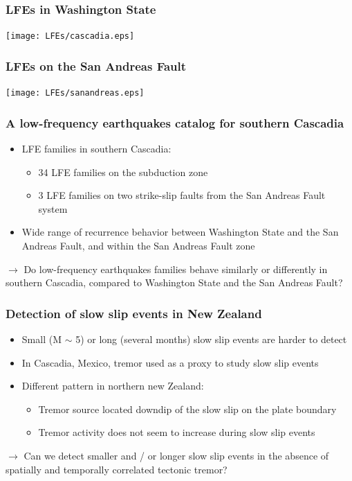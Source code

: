 \documentclass{beamer}
\begin{document}
	\begin{frame}
		\frametitle{LFEs in Washington State}
		\begin{center}
			\texttt{[image: LFEs/cascadia.eps]}
		\end{center}
	\end{frame}

	\begin{frame}
		\frametitle{LFEs on the San Andreas Fault}
		\begin{center}
			\texttt{[image: LFEs/sanandreas.eps]}
		\end{center}
	\end{frame}

	\begin{frame}
		\frametitle{A low-frequency earthquakes catalog for southern Cascadia}
		\begin{itemize}
			\item LFE families in southern Cascadia:
			\begin{itemize}
				\item 34 LFE families on the subduction zone
				\item 3 LFE families on two strike-slip faults from the San Andreas Fault system
			\end{itemize}
			\item Wide range of recurrence behavior between Washington State and the San Andreas Fault, and within the San Andreas Fault zone
		\end{itemize}
		
		\begin{block}{}
			$\rightarrow$ Do low-frequency earthquakes families behave similarly or differently in southern Cascadia, compared to Washington State and the San Andreas Fault?
		\end{block}
	\end{frame}

	\begin{frame}
		\frametitle{Detection of slow slip events in New Zealand}
		\begin{itemize}
			\item Small (M $\sim$ 5) or long (several months) slow slip events are harder to detect
			\item In Cascadia, Mexico, tremor used as a proxy to study slow slip events
			\item Different pattern in northern new Zealand:
			\begin{itemize}
				\item Tremor source located downdip of the slow slip on the plate boundary
				\item Tremor activity does not seem to increase during slow slip events
			\end{itemize}
		\end{itemize}

		\begin{block}{}
			$\rightarrow$ Can we detect smaller and / or longer slow slip events in the absence of spatially and temporally correlated tectonic tremor?
		\end{block}			
	\end{frame}
\end{document}
